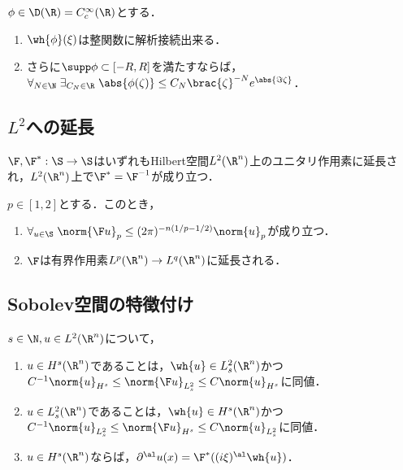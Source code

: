 \documentclass[uplatex, dvipdfmx]{jsreport}
\begin{document}
\begin{theorem}
    $\phi\in\D(\R)=C_c^\infty(\R)$とする．
    \begin{enumerate}
        \item $\wh{\phi}(\xi)$は整関数に解析接続出来る．
        \item さらに$\supp\phi\subset[-R,R]$を満たすならば，$\forall_{N\in\N}\;\exists_{C_N\in\R}\;\abs{\phi(\zeta)}\le C_N\brac{\zeta}^{-N}e^{\abs{\Im\zeta}}$．
    \end{enumerate}
\end{theorem}

\subsection{$L^2$への延長}

\begin{theorem}
    $\F,\F^*:\S\to\S$はいずれもHilbert空間$L^2(\R^n)$上のユニタリ作用素に延長され，$L^2(\R^n)$上で$\F^*=\F^{-1}$が成り立つ．
\end{theorem}

\begin{theorem}
    $p\in[1,2]$とする．このとき，
    \begin{enumerate}
        \item $\forall_{u\in\S}\;\norm{\F u}_p\le(2\pi)^{-n(1/p-1/2)}\norm{u}_p$が成り立つ．
        \item $\F$は有界作用素$L^p(\R^n)\to L^q(\R^n)$に延長される．
    \end{enumerate}
\end{theorem}

\subsection{Sobolev空間の特徴付け}

\begin{theorem}
    $s\in\N,u\in L^2(\R^n)$について，
    \begin{enumerate}
        \item $u\in H^s(\R^n)$であることは，$\wh{u}\in L^2_s(\R^n)$かつ$C^{-1}\norm{u}_{H^s}\le\norm{\F u}_{L^2_s}\le C\norm{u}_{H^s}$に同値．
        \item $u\in L^2_s(\R^n)$であることは，$\wh{u}\in H^s(\R^n)$かつ$C^{-1}\norm{u}_{L^2_s}\le\norm{\F u}_{H^s}\le C\norm{u}_{L^2_s}$に同値．
        \item $u\in H^s(\R^n)$ならば，$\partial^\al u(x)=\F^*((i\xi)^\al\wh{u})$．
    \end{enumerate}
\end{theorem}
\end{document}
